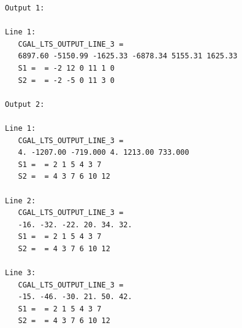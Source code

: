 \begin{verbatim}
Output 1:

Line 1:
   CGAL_LTS_OUTPUT_LINE_3 =  
   6897.60 -5150.99 -1625.33 -6878.34 5155.31 1625.33  
   S1 =  = -2 12 0 11 1 0
   S2 =  = -2 -5 0 11 3 0

Output 2:

Line 1:
   CGAL_LTS_OUTPUT_LINE_3 =  
   4. -1207.00 -719.000 4. 1213.00 733.000
   S1 =  = 2 1 5 4 3 7
   S2 =  = 4 3 7 6 10 12

Line 2:
   CGAL_LTS_OUTPUT_LINE_3 =  
   -16. -32. -22. 20. 34. 32.
   S1 =  = 2 1 5 4 3 7
   S2 =  = 4 3 7 6 10 12

Line 3:
   CGAL_LTS_OUTPUT_LINE_3 =  
   -15. -46. -30. 21. 50. 42.
   S1 =  = 2 1 5 4 3 7
   S2 =  = 4 3 7 6 10 12
\end{verbatim}


